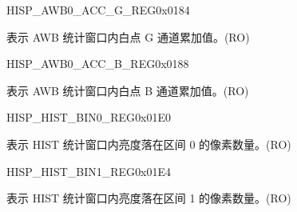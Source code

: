 \begin{register}{H}{ISP\_AWB0\_ACC\_G\_REG}{0x0184}\label{regdesc:ISPAWB0ACCGREG}
%
\regnewline%
\begin{regdesc}\begin{reglist}
\label{fielddesc:ISPAWB0ACCG}\item [ISP\_AWB0\_ACC\_G] 表示 AWB 统计窗口内白点 G 通道累加值。(RO)
\end{reglist}\end{regdesc}
\end{register}


\begin{register}{H}{ISP\_AWB0\_ACC\_B\_REG}{0x0188}\label{regdesc:ISPAWB0ACCBREG}
%
\regnewline%
\begin{regdesc}\begin{reglist}
\label{fielddesc:ISPAWB0ACCB}\item [ISP\_AWB0\_ACC\_B] 表示 AWB 统计窗口内白点 B 通道累加值。(RO)
\end{reglist}\end{regdesc}
\end{register}




\begin{register}{H}{ISP\_HIST\_BIN0\_REG}{0x01E0}\label{regdesc:ISPHISTBIN0REG}
%
%
\regnewline%
\begin{regdesc}\begin{reglist}
\label{fielddesc:ISPHISTBIN0}\item [ISP\_HIST\_BIN\_0] 表示 HIST 统计窗口内亮度落在区间 0 的像素数量。(RO)
\end{reglist}\end{regdesc}
\end{register}


\begin{register}{H}{ISP\_HIST\_BIN1\_REG}{0x01E4}\label{regdesc:ISPHISTBIN1REG}
%
%
\regnewline%
\begin{regdesc}\begin{reglist}
\label{fielddesc:ISPHISTBIN1}\item [ISP\_HIST\_BIN\_1] 表示 HIST 统计窗口内亮度落在区间 1 的像素数量。(RO)
\end{reglist}\end{regdesc}
\end{register}


